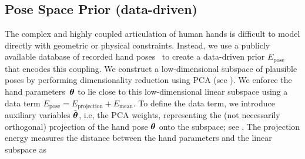 

\subsection*{Pose Space Prior (data-driven)}


The complex and highly coupled articulation of human hands is difficult to model directly with geometric or physical constraints. Instead, we use a publicly available database of recorded hand poses~\cite{schroder2014real} to create a data-driven prior $E_{\text{pose}}$ that encodes this coupling.
We construct a low-dimensional subspace of plausible poses by performing dimensionality reduction using PCA (see ). 
% 
%
We enforce the hand parameters~$\boldsymbol{\theta}$ to lie close to this low-dimensional linear subspace using a 
 data term
$E_{\text{pose}} = E_{\text{projection}} + E_{\text{mean}}$.
%
To define the data term, we introduce auxiliary variables $\tilde{\boldsymbol{\theta}}$, i.e, the PCA weights, representing the (not necessarily orthogonal) projection of the hand pose $\boldsymbol{\theta}$ onto the subspace; see .
The projection energy  measures the distance between the hand parameters and the linear subspace as
